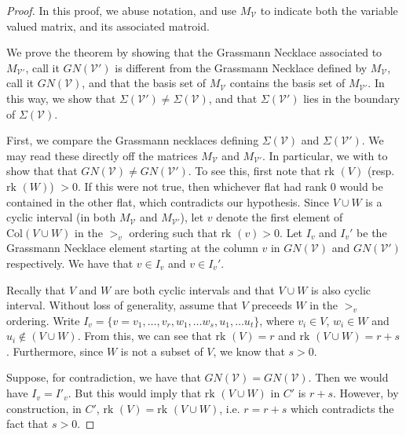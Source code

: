 \documentclass[11pt]{article}
\newcommand{\rk}{\textrm{rk }}
\newcommand{\cV}{\mathcal{V}}
\newcommand{\cB}{\mathcal{B}}
\newcommand{\Cols}{\textrm{Col}}
\theoremstyle{remark}
\theoremstyle{definition}
\begin{document}
\begin{proof} 
In this proof, we abuse notation, and use $M_\cV$ to indicate both the variable valued matrix, and its associated matroid.

We prove the theorem by showing that the Grassmann Necklace associated to $M_{\cV'}$, call it $GN(\cV')$ is different from the Grassmann Necklace defined by $M_{\cV}$, call it $GN(\cV)$, and that the basis set of $M_{\cV}$ contains the basis set of $M_{\cV'}$. In this way, we show that $\Sigma(\cV') \neq \Sigma(\cV)$, and that  $\Sigma(\cV')$ lies in the boundary of $\Sigma(\cV)$. 

First, we compare the Grassmann necklaces defining $\Sigma(\cV)$ and $\Sigma(\cV')$. We may read these directly off the matrices $M_{\cV}$ and $M_{\cV'}$. In particular, we with to show that that $GN(\cV) \neq GN(\cV')$. To see this, first note that $\rk(V)$ (resp. $\rk(W)$) $>0$. If this were not true, then whichever flat had rank $0$ would be contained in the other flat, which contradicts our hypothesis. Since $V \cup W$ is a cyclic interval (in both $M_\cV$ and $M_{\cV'}$), let $v$ denote the first element of $\Cols(V\cup W)$ in the $>_v$ ordering such that $\rk(v) >0$. Let $I_v$ and $I_v'$ be the Grassmann Necklace element starting at the column $v$ in $GN(\cV)$ and $GN(\cV')$ respectively. We have that $v \in I_v$ and $v \in I_v'$. 

Recally that $V$ and $W$ are both cyclic intervals and that $V \cup W$ is also cyclic interval. Without loss of generality, assume that $V$ preceeds $W$ in the $>_v$ ordering. Write $I_v = \{v = v_1, \ldots, v_r, w_1, \ldots w_s, u_1, \ldots u_t\}$, where $v_i \in V$, $w_i \in W$ and $u_i \not \in (V \cup W)$. From this, we can see that $\rk(V) = r$ and $\rk(V\cup W) = r+s$. Furthermore, since $W$ is not a subset of $V$, we know that $s > 0$. 

Suppose, for contradiction, we have that $GN(\cV) = GN(\cV)$. Then we would have $I_v = I'_v$. But this would imply that $\rk(V \cup W)$ in $C'$ is $r+ s$. However, by construction, in $C'$, $\rk(V) = \rk(V\cup W)$, i.e. $r = r+s$ which contradicts the fact that $s > 0$. 

\begin{comment}
 inote that some vertex of $V$ (resp. $W$)  appears at least once in $GN(C)$. To see this, note that any element that does not ever appear in $GN(C)$ has rank $0$. Since neither $V$ nor $W$ has rank $0$, they must each contain at least one element that appears in $GN(C)$. Therefore, we know that there exists some $I_j \in GN(C)$ such that $I_j \cap W \neq \emptyset$. Fix such a $j$ and let $a \in  I_j \cap W$ be an element of $W$ that is in said $I_j$. Let $I'_j$ be the correposponding element of $GN(C')$. We claim that $I_j \neq I_j'$. That is, the $j^{th}$ minor in $GN(C')$ is not the same as the $j^{th}$ minor of $GN(C)$. This shows that $M(C)$ and $M(C')$ define two different positroid cells. Then it remains to show that the the basis set $\cB$ of $M(C)$ contains the basis set $\cB'$ of $M(C')$. 


\end{comment}
\end{proof}
\end{document}
